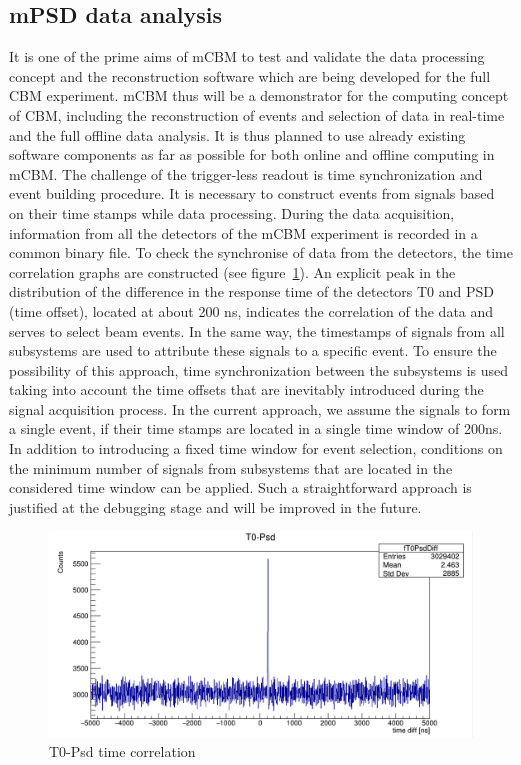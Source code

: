 \documentclass[a4paper,11pt]{article}
\begin{document}
\subsection{mPSD data analysis}
It is one of the prime aims of mCBM to test and validate the data processing concept and the reconstruction software which are being developed for the full CBM experiment. mCBM thus will be a demonstrator for the computing concept of CBM, including the reconstruction of events and selection of data in real-time and the full offline data analysis. It is thus planned to use already existing software components as far as possible for both online and offline computing in mCBM.
The challenge of the trigger-less readout is time synchronization and event building procedure. It is necessary to construct events from signals based on their time stamps while data processing.
During the data acquisition, information from all the detectors of the mCBM experiment is recorded in a common binary file. To check the synchronise of data from the detectors, the time correlation graphs are constructed (see figure~\ref{fig:6}). An explicit peak in the distribution of the difference in the response time of the detectors T0 and PSD (time offset), located at about 200 ns, indicates the correlation of the data and serves to select beam events.
In the same way, the timestamps of signals from all subsystems are used to attribute these signals to a specific event. To ensure the possibility of this approach, time synchronization between the subsystems is used taking into account the time offsets that are inevitably introduced during the signal acquisition process. In the current approach, we assume the signals to form a single event, if their time stamps are located in a single time window of 200ns. In addition to introducing a fixed time window for event selection, conditions on the minimum number of signals from subsystems that are located in the considered time window can be applied. Such a straightforward approach is justified at the debugging stage and will be improved in the future.

\begin{figure}[htbp]
\centering %
\includegraphics[width=\textwidth]{run582T0Psd.png}

\caption{\label{fig:6} T0-Psd time correlation}
\end{figure}
\end{document}
